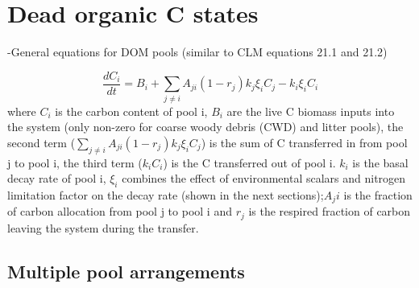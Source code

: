 \documentclass[twoside,10pt]{report}
\begin{document}
\section{Dead organic C states}

-General equations for DOM pools (similar to CLM equations 21.1 and 21.2)

\begin{equation}
\frac{dC_{i}}{dt} = B_i + \sum_{j\neq i}A_{ji}(1 - r_j)k_j\xi_iC_j - k_i\xi_iC_i
\end{equation}
    where $C_i$ is the carbon content of pool i, $B_i$ are the live C biomass inputs into the system (only non-zero for coarse woody debris (CWD) and litter pools), the second term ($\sum_{j\neq i}A_{ji}(1 - r_j)k_j\xi_iC_j$) is the sum of C transferred in from pool j to pool i, the third term ($k_iC_i$) is the C transferred out of pool i. $k_i$ is the basal decay rate of pool i, $\xi_i$ combines the effect of environmental scalars and nitrogen limitation factor on the decay rate (shown in the next sections);$A_ji$ is the fraction of carbon allocation from pool j to pool i and $r_j$ is the respired fraction of carbon leaving the system during the transfer.


\subsection{Multiple pool arrangements}
\end{document}
